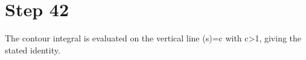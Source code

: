 \section*{Step 42}

The contour integral is evaluated on the vertical line \Re(s)=c with c>1, giving the stated identity.

